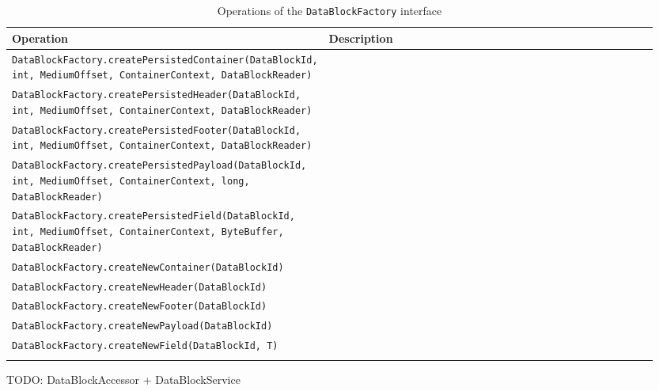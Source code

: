 \small
\begin{landscape}
\begin{longtable}{|p{0.3\linewidth}|p{0.65\linewidth}|}
\hline
\rowcolor[gray]{.9}\textbf{Operation} & \textbf{Description} \\
\endhead
\hline
\texttt{DataBlockFactory.}\texttt{createPersistedContainer(DataBlockId, int, MediumOffset, ContainerContext, DataBlockReader)} &  \\
\hline
\texttt{DataBlockFactory.}\texttt{createPersistedHeader(DataBlockId, int, MediumOffset, ContainerContext, DataBlockReader)} &  \\
\hline
\texttt{DataBlockFactory.}\texttt{createPersistedFooter(DataBlockId, int, MediumOffset, ContainerContext, DataBlockReader)} &  \\
\hline
\texttt{DataBlockFactory.}\texttt{createPersistedPayload(DataBlockId, int, MediumOffset, ContainerContext, long, DataBlockReader)} &  \\
\hline
\texttt{DataBlockFactory.}\texttt{createPersistedField(DataBlockId, int, MediumOffset, ContainerContext, ByteBuffer, DataBlockReader)} &  \\
\hline
\texttt{DataBlockFactory.}\texttt{createNewContainer(DataBlockId)} &  \\
\hline
\texttt{DataBlockFactory.}\texttt{createNewHeader(DataBlockId)} &  \\
\hline
\texttt{DataBlockFactory.}\texttt{createNewFooter(DataBlockId)} &  \\
\hline
\texttt{DataBlockFactory.}\texttt{createNewPayload(DataBlockId)} &  \\
\hline
\texttt{DataBlockFactory.}\texttt{createNewField(DataBlockId, T)} &  \\
\hline
\caption{Operations of the \texttt{DataBlockFactory} interface}
\label{tab:DBOpsDataBlockFactory}
\end{longtable}
\end{landscape}
\normalsize

TODO: DataBlockAccessor + DataBlockService

%
%
